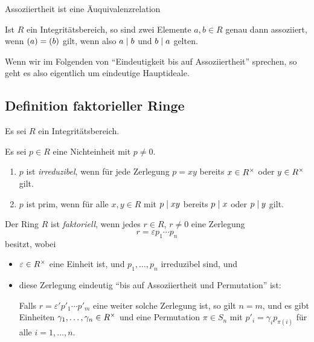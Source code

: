 \begin{lemma}
  Assoziiertheit ist eine Äuquivalenzrelation
\end{lemma}

\begin{lemma}
  Ist $R$ ein Integritätsbereich, so sind zwei Elemente $a, b \in R$ genau dann assoziiert, wenn $(a) = (b)$ gilt, wenn also $a \mathrel{|} b$ und $b \mathrel{|} a$ gelten.
\end{lemma}

Wenn wir im Folgenden von \enquote{Eindeutigkeit bis auf Assoziiertheit} sprechen, so geht es also eigentlich um eindeutige Hauptideale.



\subsection{Definition faktorieller Ringe}

Es sei $R$ ein Integritätsbereich.

\begin{definition}
  Es sei $p \in R$ eine Nichteinheit mit $p \neq 0$.
  \begin{enumerate}
    \item
      $p$ ist \emph{irreduzibel}, wenn für jede Zerlegung $p = xy$ bereits $x \in R^{\times}$ oder $y \in R^{\times}$ gilt.
    \item
       $p$ ist prim, wenn für alle $x, y \in R$ mit $p \mathrel{|} xy$ bereits $p \mathrel{|} x$ oder $p \mathrel{|} y$ gilt.
  \end{enumerate}
\end{definition}

\begin{definition}
\label{definition: ufd}
  Der Ring $R$ ist \emph{faktoriell}, wenn jedes $r \in R$, $r \neq 0$ eine Zerlegung
  \begin{equation}
  \label{equation: decomposition into irreducibles}
    r = \varepsilon p_1 \dotsm p_n
  \end{equation}
  besitzt, wobei
  \begin{itemize}
    \item
      $\varepsilon \in R^{\times}$ eine Einheit ist, und $p_1, \dotsc, p_n$ irreduzibel sind, und
    \item
      diese Zerlegung eindeutig \enquote{bis auf Assoziiertheit und Permutation} ist:
      
      Falls $r = \varepsilon' p'_1 \dotsm p'_m$ eine weiter solche Zerlegung ist, so gilt $n = m$, und es gibt Einheiten $\gamma_1, \dotsc, \gamma_n \in R^{\times}$ und eine Permutation $\pi \in S_n$ mit $p'_i = \gamma_i p_{\pi(i)}$ für alle $i = 1, \dotsc, n$.
  \end{itemize}
\end{definition}

